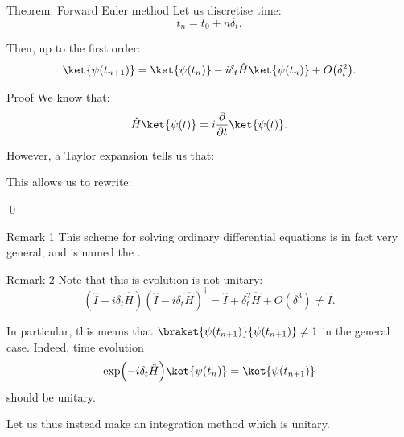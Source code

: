 \documentclass[a4paper]{article}
\begin{document}
\begin{parag}{Theorem: Forward Euler method}
    Let us discretise time:
    \[t_n = t_0 + n \delta_t.\]
    
    Then, up to the first order:
    \[\ket{\psi\left(t_{n+1}\right)} = \ket{\psi\left(t_n\right)} - i \delta_t \hat{H} \ket{\psi\left(t_n\right)} + O\left(\delta_t^2\right).\]
    
    \begin{subparag}{Proof}
        We know that:
        \[\hat{H} \ket{\psi\left(t\right)} = i \frac{\partial}{\partial t} \ket{\psi\left(t\right)}.\]
        
        However, a Taylor expansion tells us that: 

        This allows us to rewrite: 
        
        \qed
    \end{subparag}

    \begin{subparag}{Remark 1}
        This scheme for solving ordinary differential equations is in fact very general, and is named the .
    \end{subparag}

    \begin{subparag}{Remark 2}
        Note that this is evolution is not unitary: 
        \[\left(\hat{I} - i \delta_t \hat{H}\right)\left(\hat{I} - i \delta_t \hat{H}\right)^{\dagger} = \hat{I} + \delta_t^2 \hat{H} + O\left(\delta^3\right) \neq \hat{I}.\]

        In particular, this means that $\braket{\psi\left(t_{n+1}\right)}{\psi\left(t_{n+1}\right)} \neq 1$ in the general case. Indeed, time evolution
        \[\exp\left(-i \delta_t \hat{H}\right) \ket{\psi\left(t_n\right)} = \ket{\psi\left(t_{n+1}\right)}\]
        should be unitary.

        Let us thus instead make an integration method which is unitary.
    \end{subparag}
\end{parag}
\end{document}
